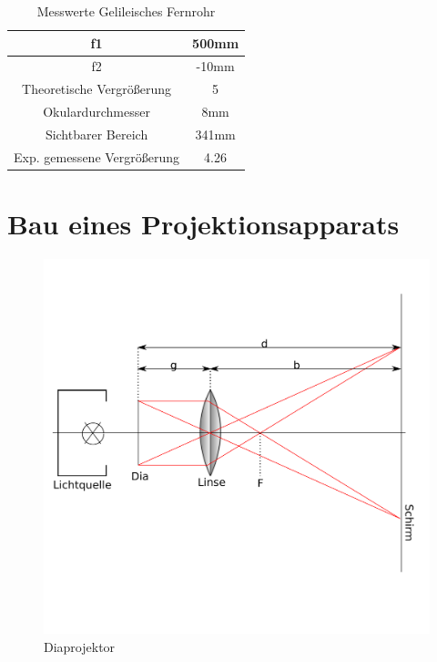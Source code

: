 \begin{table}[h]
    \centering
\begin{tabular}{|c|c|}
	\hline
	f1 & 500mm \\
	\hline
	f2 & -10mm \\
	\hline
	Theoretische Vergrößerung & 5 \\
	\hline
	Okulardurchmesser & 8mm \\
	\hline
	Sichtbarer Bereich & 341mm \\
	\hline
	Exp. gemessene Vergrößerung & 4.26 \\
	\hline
    \end{tabular}
    \caption{Messwerte Gelileisches Fernrohr}
    \label{tab:Tabellegalileo}
\end{table}

\clearpage

\section{Bau eines Projektionsapparats}

\begin{figure}[h!]
    \centering
    \includegraphics[scale=0.8]{Geometrische_Optik/Protokoll/fig/Diaprojektor.png}
    \caption{Diaprojektor}
    \label{fig:Diaprojektor}
\end{figure}

